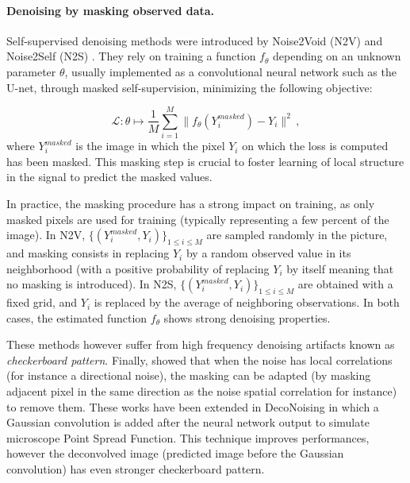 \documentclass{article}
\begin{document}
\paragraph{Denoising by masking observed data.}
Self-supervised denoising methods were introduced by Noise2Void (N2V) \cite{krull2018noise2void} and Noise2Self (N2S) \cite{batson2019noise2self}. They rely on training a function $f_\theta$ depending on an unknown parameter $\theta$, usually  implemented as a convolutional neural network such as the U-net, through masked self-supervision, minimizing the following objective:

$$\mathcal{L}: \theta\mapsto \frac{1}{M}\sum_{i=1}^M \|f_\theta(Y^{masked}_i) - Y_i\|^2\,, $$
where $Y^{masked}_i$ is the image in which the pixel $Y_i$  on which the loss is computed  has been masked. This masking step is crucial to foster learning of  local structure in the signal to predict the masked values.

In practice, the masking procedure has a strong impact on training, as only masked pixels are used for training (typically representing a few percent of the image). In N2V, $\{(Y^{masked}_i,Y_i)\}_{1\leqslant i\leqslant M}$ are sampled  randomly in the picture, and masking consists in replacing $Y_i$ by a random observed value in its neighborhood (with a positive probability of replacing $Y_i$ by itself meaning that no masking is introduced). In N2S,  $\{(Y^{masked}_i,Y_i)\}_{1\leqslant i\leqslant M}$ are obtained with  a fixed grid, and $Y_i$ is replaced by the average of neighboring observations. 
In both cases, the estimated function $f_{\theta}$ shows strong denoising properties.

These methods however suffer from high frequency denoising artifacts known as \textit{checkerboard pattern}. Finally, \cite{broaddus2020removing} showed that when the noise has  local correlations (for instance a  directional noise), the masking can be adapted (by masking adjacent pixel in the same direction as the noise spatial correlation for instance) to remove them. These works have been extended in DecoNoising \cite{goncharova2020} in which a Gaussian convolution is added after the neural network output to simulate microscope Point Spread Function. This technique improves performances, however the deconvolved image (predicted image before the Gaussian convolution) has even stronger checkerboard pattern.
\end{document}
